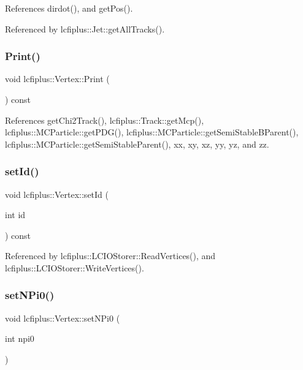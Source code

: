 References dirdot(), and get\+Pos().



Referenced by lcfiplus\+::\+Jet\+::get\+All\+Tracks().

\mbox{\label{classlcfiplus_1_1Vertex_a1d4f11a05e4ff8098e83a4b8645560ce}} 
\subsubsection{Print()}
{\footnotesize\ttfamily void lcfiplus\+::\+Vertex\+::\+Print (\begin{DoxyParamCaption}{ }\end{DoxyParamCaption}) const}



References get\+Chi2\+Track(), lcfiplus\+::\+Track\+::get\+Mcp(), lcfiplus\+::\+M\+C\+Particle\+::get\+P\+D\+G(), lcfiplus\+::\+M\+C\+Particle\+::get\+Semi\+Stable\+B\+Parent(), lcfiplus\+::\+M\+C\+Particle\+::get\+Semi\+Stable\+Parent(), xx, xy, xz, yy, yz, and zz.

\mbox{\label{classlcfiplus_1_1Vertex_a94d77f90a0a3559bec53827c2d4b27b1}} 
\subsubsection{set\+Id()}
{\footnotesize\ttfamily void lcfiplus\+::\+Vertex\+::set\+Id (\begin{DoxyParamCaption}\item[{int}]{id }\end{DoxyParamCaption}) const\hspace{0.3cm}{\ttfamily [inline]}}



Referenced by lcfiplus\+::\+L\+C\+I\+O\+Storer\+::\+Read\+Vertices(), and lcfiplus\+::\+L\+C\+I\+O\+Storer\+::\+Write\+Vertices().

\mbox{\label{classlcfiplus_1_1Vertex_a39ca89c2ee89689a6e71464315536a9c}} 
\subsubsection{set\+N\+Pi0()}
{\footnotesize\ttfamily void lcfiplus\+::\+Vertex\+::set\+N\+Pi0 (\begin{DoxyParamCaption}\item[{int}]{npi0 }\end{DoxyParamCaption})\hspace{0.3cm}{\ttfamily [inline]}}


